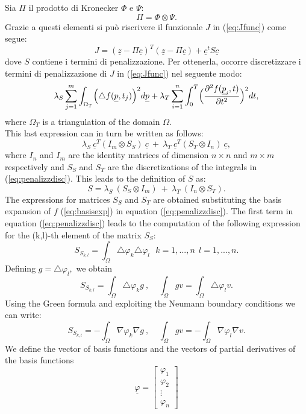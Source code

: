 \documentclass[a4paper,11pt,twoside,openright]{book}							%
\begin{document}
Sia $\Pi$ il prodotto di Kronecker $\Phi$ e $\Psi$:
$$ \Pi = \Phi \otimes \Psi .$$
Grazie a questi elementi si può riscrivere il funzionale $J$ in (\ref{eq:Jfunc}) come segue:
\begin{equation} 
\label{eq:Jmatr}
J = (\underline z - \Pi \underline c)^T (\underline z - \Pi \underline c) + \underline c^t S \underline c 
\end{equation}
dove $S$ contiene i termini di penalizzazione. Per ottenerla, occorre discretizzare i termini di penalizzazione di $J$ in (\ref{eq:Jfunc}) nel seguente modo:
\begin{equation}
\label{eq:penalizzdisc}
\lambda_S  \sum_{j=1}^m \int_{\Omega_T} \Bigl( \triangle f(\underline p,t_j)  \Bigr)^2 d \underline p+ \lambda_T \sum_{i=1}^n\int_0^T \Bigl( \frac{\partial^2 f(\underline p_i,t) }{\partial t ^2} \Bigr)^2 dt ,
\end{equation}
where $\Omega_T$ is a triangulation of the domain $\Omega$.\\
This last expression can in turn be written as follows:
$$ \lambda_S\   \underline c^T (I_m \otimes S_S)\  \underline c   \ +\  \lambda_T\  \underline c^T ( S_T \otimes I_n)\  \underline c  ,$$
where $I_n$ and $I_m$ are the identity matrices of dimension $n \times n$ and $m \times m$ respectively and $S_S$ and $S_T$ are the discretizations of the integrals in (\ref{eq:penalizzdisc}). This leads to the definition of $S$ as:
$$ S = \lambda_S\    (S_S \otimes I_m)   \ +\  \lambda_T\   (I_n \otimes S_T)  .$$
The expressions for matrices $S_S$ and $S_T$ are obtained substituting the basis expansion of $f$ (\ref{eq:basisexp}) in equation (\ref{eq:penalizzdisc}).
The first term in equation (\ref{eq:penalizzdisc}) leads to the computation of the following expression for the (k,l)-th element of the matrix $S_S$:
$$S_{S_{k,l}} = \int_\Omega \triangle \varphi_k \triangle \varphi_l \ \ \ k = 1, ... , n\ \ l = 1, ... , n.$$
Defining $ g = \triangle\varphi_l ,$ we obtain
$$ S_{S_{k,l}} = \int_\Omega \triangle \varphi_k g \ , \ \ \ \ \ \int_\Omega g v = \int_\Omega \triangle \varphi_l v.$$
Using the Green formula and exploiting the Neumann boundary conditions we can write:
$$S_{S_{k,l}} = -\int_\Omega \nabla \varphi_k \nabla g \ , \ \ \ \ \ \int_\Omega g v = -\int_\Omega \nabla \varphi_l \nabla v.$$
We define the vector of basis functions and the vectors of partial derivatives of the basis functions
$$
\underline \varphi =
\begin{bmatrix}
\varphi_{1}  \\
\varphi_{2}  \\
\vdots\\
\varphi_{n}
\end{bmatrix}
$$
\end{document}
